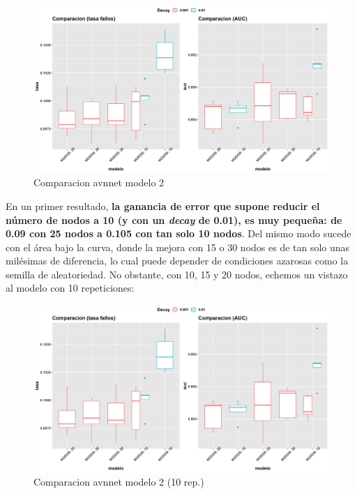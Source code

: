 \documentclass[
]{article}
\begin{document}
\begin{figure}[h!]

{\centering \includegraphics[width=0.99\linewidth,height=0.99\textheight,]{./charts/02_comparacion_tasa_auc_modelo2_5rep} 

}

\caption{Comparacion avnnet modelo 2}\label{fig:unnamed-chunk-58}
\end{figure}

En un primer resultado, \textbf{la ganancia de error que supone reducir
el número de nodos a 10 (y con un \emph{decay} de 0.01), es muy pequeña:
de 0.09 con 25 nodos a 0.105 con tan solo 10 nodos}. Del mismo modo
sucede con el área bajo la curva, donde la mejora con 15 o 30 nodos es
de tan solo unas milésimas de diferencia, lo cual puede depender de
condiciones azarosas como la semilla de aleatoriedad. No obstante, con
10, 15 y 20 nodos, echemos un vistazo al modelo con 10 repeticiones:

\begin{figure}[h!]

{\centering \includegraphics[width=0.99\linewidth,height=0.99\textheight,]{./charts/02_comparacion_tasa_auc_modelo2_5rep} 

}

\caption{Comparacion avnnet modelo 2 (10 rep.)}\label{fig:unnamed-chunk-59}
\end{figure}
\end{document}
